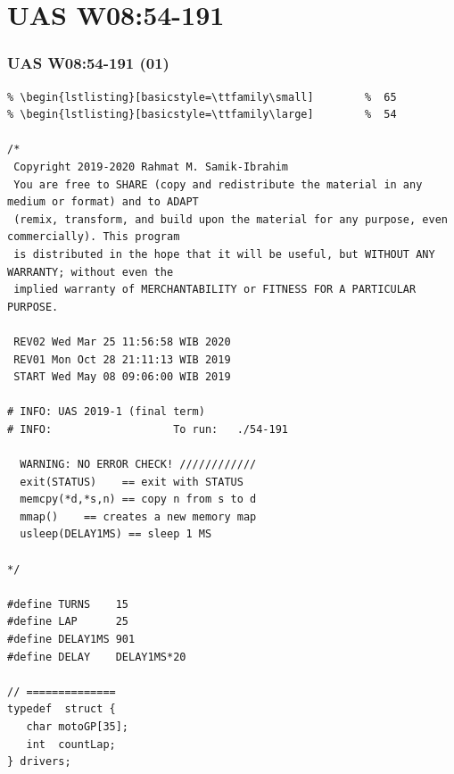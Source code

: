 \documentclass[xcolor=table, notheorems, hyperref={pdfpagelabels=false}]{beamer}
\begin{document}
\section{UAS W08:54-191}
\begin{frame}[fragile]
\frametitle{UAS W08:54-191 (01)}
\begin{lstlisting}[basicstyle=\ttfamily\tiny]         % 108
% \begin{lstlisting}[basicstyle=\ttfamily\footnotesize] %  72
% \begin{lstlisting}[basicstyle=\ttfamily\small]        %  65
% \begin{lstlisting}[basicstyle=\ttfamily\large]        %  54

/*
 Copyright 2019-2020 Rahmat M. Samik-Ibrahim
 You are free to SHARE (copy and redistribute the material in any medium or format) and to ADAPT 
 (remix, transform, and build upon the material for any purpose, even commercially). This program
 is distributed in the hope that it will be useful, but WITHOUT ANY WARRANTY; without even the 
 implied warranty of MERCHANTABILITY or FITNESS FOR A PARTICULAR PURPOSE.

 REV02 Wed Mar 25 11:56:58 WIB 2020
 REV01 Mon Oct 28 21:11:13 WIB 2019
 START Wed May 08 09:06:00 WIB 2019

# INFO: UAS 2019-1 (final term)
# INFO:                   To run:   ./54-191 

  WARNING: NO ERROR CHECK! ////////////
  exit(STATUS)    == exit with STATUS
  memcpy(*d,*s,n) == copy n from s to d
  mmap()    == creates a new memory map
  usleep(DELAY1MS) == sleep 1 MS

*/

#define TURNS    15
#define LAP      25
#define DELAY1MS 901
#define DELAY    DELAY1MS*20

// ==============
typedef  struct {
   char motoGP[35];
   int  countLap;
} drivers;

\end{lstlisting}
\end{frame}
\end{document}
